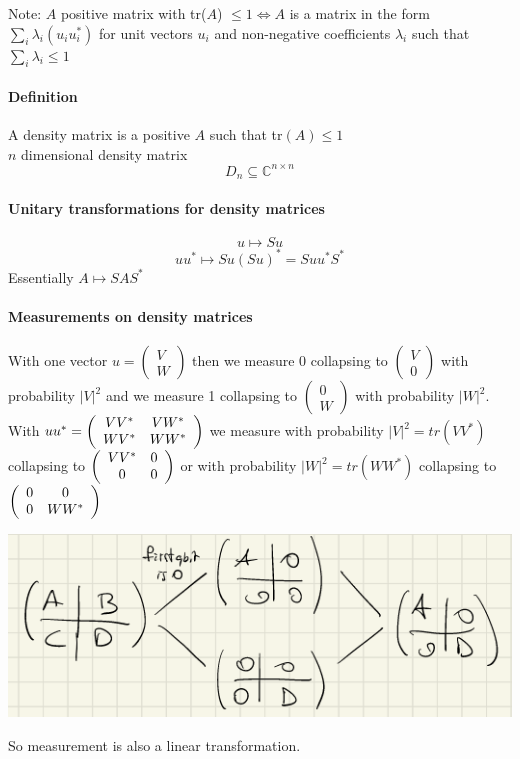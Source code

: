 \documentclass[10pt]{report}
\begin{document}
Note: $A$ positive matrix with tr($A$) $\leq 1\Leftrightarrow A$ is a matrix in the form $\sum_i \lambda_i(u_iu_i^*)$ for unit vectors $u_i$ and non-negative coefficients $\lambda_i$ such that $\sum_i \lambda_i \leq 1$
\paragraph{Definition} A density matrix is a positive $A$ such that tr$(A)\leq 1$\\
$n$ dimensional density matrix
$$D_n\subseteq \mathbb{C}^{n\times n}$$
\paragraph{Unitary transformations for density matrices}
$$u\mapsto Su$$
$$uu^*\mapsto Su(Su)^* = Suu^*S^*$$
Essentially $A\mapsto SAS^*$
\paragraph{Measurements on density matrices} With one vector $u=\left(\begin{array}{c}
V\\W
\end{array}\right)$ then we measure 0 collapsing to $\left(\begin{array}{c}
V\\0
\end{array}\right)$ with probability $|V|^2$ and we measure 1 collapsing to $\left(\begin{array}{c}
0\\W
\end{array}\right)$ with probability $|W|^2$.\\
With $uu^* = \left(\begin{array}{c c}
VV^*&VW^*\\WV^*&WW^*
\end{array}\right)$ we measure with probability $|V|^2=tr(VV^*)$ collapsing to $\left(\begin{array}{c c}
VV^*&0\\0&0
\end{array}\right)$ or with probability $|W|^2=tr(WW^*)$ collapsing to $\left(\begin{array}{c c}
0&0\\0&WW^*
\end{array}\right)$
\begin{center}
	\includegraphics[scale=0.5]{43.png} %
\end{center}
So measurement is also a linear transformation.
\end{document}
